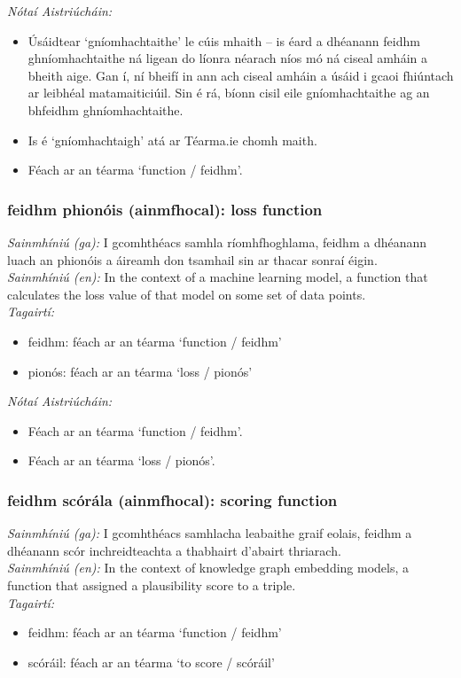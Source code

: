\documentclass{article}
\begin{document}
 \noindent \textit{Nótaí Aistriúcháin:}
\begin{itemize}
	\item Úsáidtear `gníomhachtaithe' le cúis mhaith -- is éard a dhéanann feidhm ghníomhachtaithe ná ligean do líonra néarach níos mó ná ciseal amháin a bheith aige. Gan í, ní bheifí in ann ach ciseal amháin a úsáid i gcaoi fhiúntach ar leibhéal matamaiticiúil. Sin é rá, bíonn cisil eile gníomhachtaithe ag an bhfeidhm ghníomhachtaithe.
	\item Is é `gníomhachtaigh' atá ar Téarma.ie chomh maith.
	\item Féach ar an téarma `function / feidhm'.
\end{itemize}


\subsubsection*{feidhm phionóis (ainmfhocal): loss function}
 \noindent \textit{Sainmhíniú (ga):} I gcomhthéacs samhla ríomhfhoghlama, feidhm a dhéanann luach an phionóis a áireamh don tsamhail sin ar thacar sonraí éigin.
\\
 \noindent \textit{Sainmhíniú (en):} In the context of a machine learning model, a function that calculates the loss value of that model on some set of data points.
\\
 \noindent \textit{Tagairtí:}
\begin{itemize}
	\item feidhm: féach ar an téarma `function / feidhm'
	\item pionós: féach ar an téarma `loss / pionós'
\end{itemize}

 \noindent \textit{Nótaí Aistriúcháin:}
\begin{itemize}
	\item Féach ar an téarma `function / feidhm'.
	\item Féach ar an téarma `loss / pionós'.
\end{itemize}


\subsubsection*{feidhm scórála (ainmfhocal): scoring function}
 \noindent \textit{Sainmhíniú (ga):} I gcomhthéacs samhlacha leabaithe graif eolais, feidhm a dhéanann scór inchreidteachta a thabhairt d'abairt thriarach.
\\
 \noindent \textit{Sainmhíniú (en):} In the context of knowledge graph embedding models, a function that assigned a plausibility score to a triple.
\\
 \noindent \textit{Tagairtí:}
\begin{itemize}
	\item feidhm: féach ar an téarma `function / feidhm'
	\item scóráil: féach ar an téarma `to score / scóráil'
\end{itemize}
\end{document}

